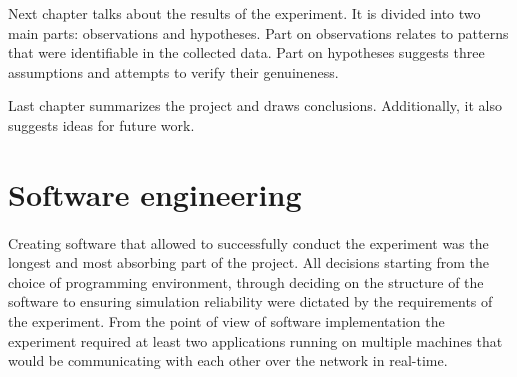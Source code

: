 \documentclass[11pt,english]{article}
\begin{document}
\par

Next chapter talks about the results of the experiment. It is divided into two main parts: observations and hypotheses. Part on observations relates to patterns that were identifiable in the collected data. Part on hypotheses suggests three assumptions and attempts to verify their genuineness.


\par

Last chapter summarizes the project and draws conclusions. Additionally, it also suggests ideas for future work.








\section{Software engineering}
\paragraph{}
Creating software that allowed to successfully conduct the experiment was the longest and most absorbing part of the project. All decisions starting from the choice of programming environment, through deciding on the structure of the software to ensuring simulation reliability were dictated by the requirements of the experiment. From the point of view of software implementation the experiment required at least two applications running on multiple machines that would be communicating with each other over the network in real-time.
\end{document}
